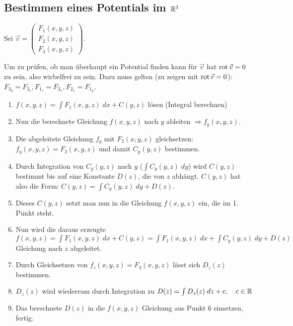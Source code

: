 \subsection{Bestimmen eines Potentials im $\mathbb{R}^3$}
Sei $\vec{v} = \begin{pmatrix}
F_1(x,y,z)\\
F_2(x,y,z)\\
F_3(x,y,z)
\end{pmatrix}$.

Um zu prüfen, ob man überhaupt ein Potential finden kann für $\vec{v}$ hat $\operatorname{rot} \vec{v} = 0$
zu sein, also wirbelfrei zu sein. Dazu muss gelten (zu zeigen mit $\operatorname{rot} \vec{v} = 0$): 
$F_{3_y} = F_{2_z}, F_{1_z} = F_{3_x}, F_{2_x} = F_{1_y}$.

\begin{enumerate}[itemsep=1em]
	\item $f(x,y,z) = \int F_1(x,y,z)\;dx + C(y,z)$ lösen (Integral berechnen)
	\item Nun die berechnete Gleichung $f(x,y,z)$ nach $y$ ableiten $\Rightarrow f_y(x,y,z)$.
	\item Die abgeleitete Gleichung $f_y$ mit $F_2(x,y,z)$ gleichsetzen: $f_y(x,y,z) = F_2(x,y,z)$
	und damit $C_y(y,z)$ bestimmen.
	\item Durch Integration von $C_y(y,z)$ nach $y$ ($\int C_y(y,z)\;dy$) wird $C(y,z)$ bestimmt
	bis auf eine Konstante $D(z)$, die von $z$ abhängt. $C(y,z)$ hat also die Form:
	$C(y,z) = \int C_y(y,z)\; dy + D(z)$.
	\item Dieses $C(y,z)$ setzt man nun in die Gleichung $f(x,y,z)$ ein, die im 1. Punkt steht.
	\item Nun wird die daraus erzeugte
	$f(x,y,z) = \int F_1(x,y,z)\;dx + C(y,z) = \int F_1(x,y,z)\;dx + \int C_y(y,z)\; dy + D(z)$
	Gleichung nach $z$ abgeleitet.
	\item Durch Gleichsetzen von $f_z(x,y,z) = F_3(x,y,z)$ lässt sich $D_z(z)$ bestimmen.
	\item $D_z(z)$ wird wiederrum durch Integration zu $D(z) = \int D_z(z)\; dz + c, \quad c \in \mathbb{R}$
	\item Das berechnete $D(z)$ in die $f(x,y,z)$ Gleichung aus Punkt 6 einsetzen, fertig.
\end{enumerate}


